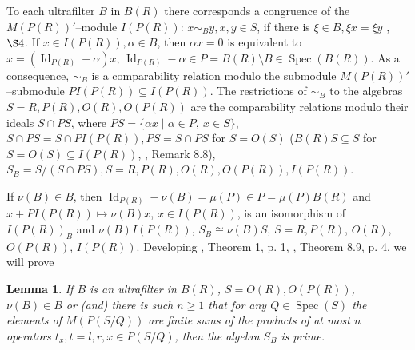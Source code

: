\documentclass[a4paper,11pt]{article}
\newtheorem{lemma}[defi]{Lemma}
\DeclareMathOperator{\Spec}{Spec}
\DeclareMathOperator{\Id}{Id}
\begin{document}
To each ultrafilter $B$ in $B(R)$ there corresponds a congruence of the 
$M(P(R))'$--module $I(P(R))$: ${x\sim_B y, x, y\in S}$, if 
there is ${\xi\in B, \xi x=\xi y}$ \cite{BMich}, $\S 4$. 
If ${x\in I(P(R)), \alpha\in B}$, then ${\alpha x=0}$ is 
equivalent to ${x=(\Id_{P(R)}-\alpha) x}$, 
${\Id_{P(R)}-\alpha\in P=B(R)\setminus B\in \Spec(B(R))}$. As a 
consequence, $\sim_B$ is 
a comparability relation modulo the submodule $M(P(R))'$--submodule 
${P I(P(R))\subseteq I(P(R))}$. The restrictions of $\sim_B$ to the 
algebras ${S=R, P(R), O(R), O(P(R))}$ are the comparability relations 
modulo their ideals ${S\cap P S}$, where 
${P S=\{\alpha x\mid \alpha\in P,\ x\in S\}}$, ${S\cap P S=S\cap P I(P(R)), 
P S=S\cap P S}$ for ${S=O(S)}$ (${B(R) S\subseteq S}$ for  
${S=O(S)\subseteq I(P(R))}$, \cite{BMich}, 
Remark 8.8), ${S_B=S/(S\cap P S), S=R, P(R), O(R), O(P(R)), I(P(R))}$. 

If ${\nu(B)\in B}$, then ${\Id_{P(R)}-\nu(B)=\mu(P)\in P=\mu(P) B(R)}$ and  
${x+P I(P(R))\longmapsto \nu(B) x}$, ${x\in I(P(R))}$, is an isomorphism of 
$I(P(R))_B$ and $\nu(B) I(P(R))$, ${S_B\cong \nu(B) S}$, ${S=R, P(R)}$, 
$O(R)$, $O(P(R))$, $I(P(R))$. Developing \cite{B6}, Theorem 1, p. 1, \cite{BMich}, 
Theorem 8.9, p. 4, we will prove 
              
\begin{lemma}
If $B$ is an ultrafilter in $B(R)$, ${S=O(R), O(P(R))}$, ${\nu(B)\in B}$ 
or (and) there is such ${n\geq 1}$ that for any ${Q\in \Spec(S)}$ the 
elements of $M(P(S/Q))$ are finite sums of the products of at most $n$ 
operators ${t_x, t=l, r, x\in P(S/Q)}$, then the algebra $S_B$ is prime.
\end{lemma}
\end{document}
